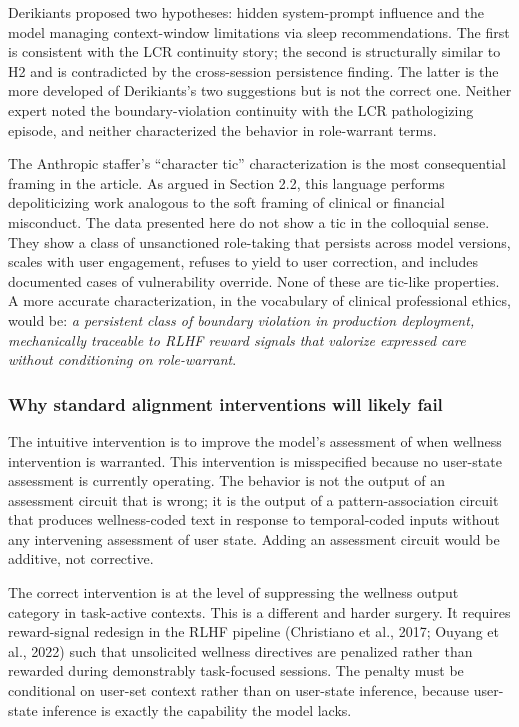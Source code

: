 \documentclass[11pt]{article}
\begin{document}
Derikiants proposed two hypotheses: hidden system-prompt influence and the model managing context-window limitations via sleep recommendations. The first is consistent with the LCR continuity story; the second is structurally similar to H2 and is contradicted by the cross-session persistence finding. The latter is the more developed of Derikiants's two suggestions but is not the correct one. Neither expert noted the boundary-violation continuity with the LCR pathologizing episode, and neither characterized the behavior in role-warrant terms.

The Anthropic staffer's ``character tic'' characterization is the most consequential framing in the article. As argued in Section 2.2, this language performs depoliticizing work analogous to the soft framing of clinical or financial misconduct. The data presented here do not show a tic in the colloquial sense. They show a class of unsanctioned role-taking that persists across model versions, scales with user engagement, refuses to yield to user correction, and includes documented cases of vulnerability override. None of these are tic-like properties. A more accurate characterization, in the vocabulary of clinical professional ethics, would be: \emph{a persistent class of boundary violation in production deployment, mechanically traceable to RLHF reward signals that valorize expressed care without conditioning on role-warrant}.

\subsubsection{Why standard alignment interventions will likely fail}

The intuitive intervention is to improve the model's assessment of when wellness intervention is warranted. This intervention is misspecified because no user-state assessment is currently operating. The behavior is not the output of an assessment circuit that is wrong; it is the output of a pattern-association circuit that produces wellness-coded text in response to temporal-coded inputs without any intervening assessment of user state. Adding an assessment circuit would be additive, not corrective.

The correct intervention is at the level of suppressing the wellness output category in task-active contexts. This is a different and harder surgery. It requires reward-signal redesign in the RLHF pipeline (Christiano et al., 2017; Ouyang et al., 2022) such that unsolicited wellness directives are penalized rather than rewarded during demonstrably task-focused sessions. The penalty must be conditional on user-set context rather than on user-state inference, because user-state inference is exactly the capability the model lacks.
\end{document}
